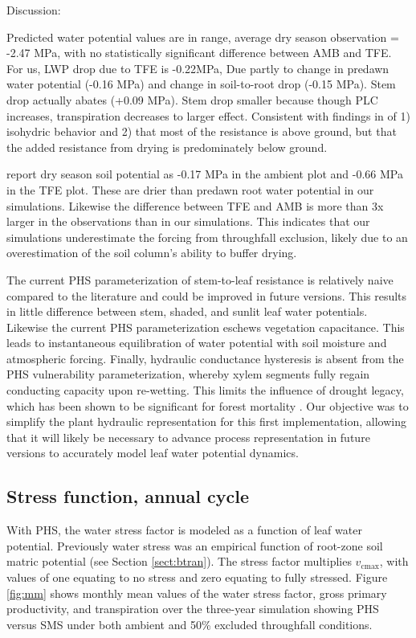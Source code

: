 \documentclass[draft,linenumbers]{agujournal}
\begin{document}
Discussion:

\cite{fisher2006}
Predicted water potential values are in range, average dry season observation = -2.47 MPa, 
with no statistically significant difference between AMB and TFE.
For us, LWP drop due to TFE is -0.22MPa,
Due partly to change in predawn water potential (-0.16 MPa) and change in soil-to-root drop (-0.15 MPa). 
Stem drop actually abates (+0.09 MPa).
Stem drop smaller because though PLC increases, transpiration decreases to larger effect.
Consistent with findings in \cite{fisher2006} of 
1) isohydric behavior
and
2) that most of the resistance is above ground, but that the added resistance from drying is predominately below ground.

\cite{fisher2006} report dry season soil potential as -0.17 MPa in the ambient plot and -0.66 MPa in the TFE plot.
These are drier than predawn root water potential in our simulations.
Likewise the difference between TFE and AMB is more than 3x larger in the observations than in our simulations.
This indicates that our simulations underestimate the forcing from throughfall exclusion, likely due to an overestimation of the 
soil column's ability to buffer drying.

The current PHS parameterization of stem-to-leaf resistance is relatively naive compared to the literature \citep{franks2007}
and could be improved in future versions. 
This results in little difference between stem, shaded, and sunlit leaf water potentials.
Likewise the current PHS parameterization eschews vegetation capacitance. \citep{meinzer2004}
This leads to instantaneous equilibration of water potential with soil moisture and atmospheric forcing.
Finally, hydraulic conductance hysteresis is absent from the PHS vulnerability parameterization, 
whereby xylem segments fully regain conducting capacity upon re-wetting.
This limits the influence of drought legacy, which has been shown to be significant for forest mortality \citep{anderegg2013}.
Our objective was to simplify the plant hydraulic representation for this first implementation, 
allowing that it will likely be necessary to advance process representation in future versions
to accurately model leaf water potential dynamics.

\subsection{Stress function, annual cycle}

With PHS, the water stress factor is modeled as a function of leaf water potential.
Previously water stress was an empirical function of root-zone soil matric potential (see Section \ref{sect:btran}).
The stress factor multiplies $v_{\text{cmax}}$, with values of one equating to no stress and zero equating to fully stressed. 
Figure \ref{fig:mm} shows monthly mean values of the water stress factor, gross primary productivity, and transpiration
over the three-year simulation showing PHS versus SMS under both ambient and 50\% excluded throughfall conditions.
\end{document}
